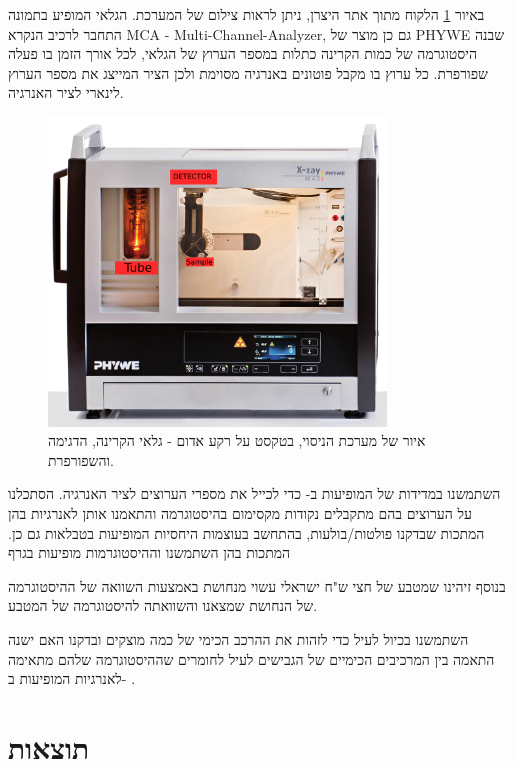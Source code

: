 \documentclass{article}
\begin{document}
באיור
\ref{fig:experiment_scheme}
הלקוח מתוך אתר היצרן, ניתן לראות צילום של המערכת. 
הגלאי המופיע בתמונה התחבר לרכיב הנקרא
\textenglish{MCA - Multi-Channel-Analyzer},
גם כן מוצר של
\textenglish{PHYWE}
שבנה היסטוגרמה של כמות הקרינה כתלות במספר הערוץ של הגלאי, לכל אורך הזמן בו פעלה שפורפרת. כל ערוץ בו מקבל פוטונים באנרגיה מסוימת ולכן הציר המייצג את מספר הערוץ לינארי לציר האנרגיה.

\begin{figure}
    \centering
    \includegraphics[width=0.8\textwidth]{./system.png}
    \caption{
    איור של מערכת הניסוי, בטקסט על רקע אדום - גלאי הקרינה, הדגימה והשפורפרת.
    }
    \label{fig:experiment_scheme}
\end{figure}

השתמשנו במדידות של המופיעות ב-
\cite{xrayBooklet}
כדי לכייל את מספרי הערוצים לציר האנרגיה. הסתכלנו על הערוצים בהם מתקבלים נקודות מקסימום בהיסטוגרמה והתאמנו אותן לאנרגיות בהן המתכות שבדקנו פולטות/בולעות, בהתחשב בעוצמות היחסיות המופיעות בטבלאות גם כן. המתכות בהן השתמשנו וההיסטוגרמות מופיעות בגרף

בנוסף זיהינו שמטבע של חצי ש"ח ישראלי עשוי מנחושת באמצעות השוואה של ההיסטוגרמה של הנחושת שמצאנו והשוואתה להיסטוגרמה של המטבע.

השתמשנו בכיול לעיל כדי לזהות את ההרכב הכימי של כמה מוצקים ובדקנו האם ישנה התאמה בין המרכיבים הכימיים של הגבישים לעיל לחומרים שההיסטוגרמה שלהם מתאימה לאנרגיות המופיעות ב-
\cite{xrayBooklet}.

\section{תוצאות}
\end{document}
